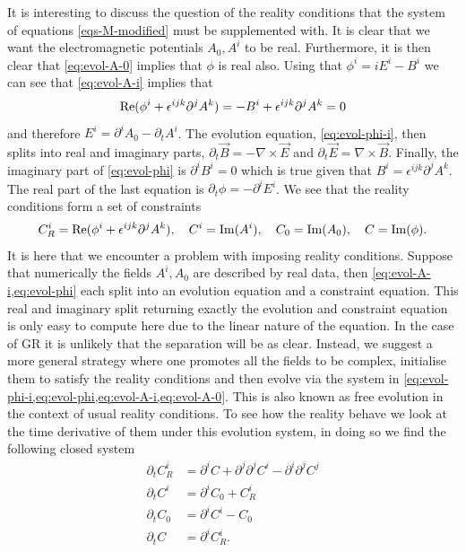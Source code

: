 \documentclass[10pt]{report}
\theoremstyle{definition}
\begin{document}
It is interesting to discuss the question of the reality conditions that the system of equations \cref{eqs-M-modified} must be supplemented with. It is clear that we want the electromagnetic potentials $A_0, A^i$ to be real. Furthermore, it is then clear that \cref{eq:evol-A-0} implies that $\phi$ is real also. Using that $\phi^i = i E^i - B^i$ we can see that \cref{eq:evol-A-i} implies that
\begin{align}
     {\rm Re}(\phi^i + \epsilon^{ijk} \partial^j A^k) = -B^i + \epsilon^{ijk} \partial^j A^k = 0
\end{align}
and therefore $E^i = \partial^i A_0 - \partial_t A^i$. The evolution equation, \cref{eq:evol-phi-i}, then splits into real and imaginary parts, $\partial_t \vec{B} = -\nabla \times \vec{E}$ and $\partial_t \vec{E} = \nabla \times \vec{B}$. Finally, the imaginary part of \cref{eq:evol-phi} is $\partial^i B^i = 0$ which is true given that $B^i = \epsilon^{ijk} \partial^j A^k$. The real part of the last equation is $\partial_t \phi = -\partial^i E^i$. We see that the reality conditions form a set of constraints
\begin{align}
    C^i_R = {\rm Re}(\phi^i + \epsilon^{ijk} \partial^j A^k), \quad C^i = {\rm Im}(A^i), \quad C_0 = {\rm Im}(A_0), \quad C = {\rm Im}(\phi). \label{eq:chiral-maxwell-reality-conditions}
\end{align}
It is here that we encounter a problem with imposing reality conditions. Suppose that numerically the fields $A^i,A_0$ are described by real data, then \cref{eq:evol-A-i,eq:evol-phi} each split into an evolution equation and a constraint equation. This real and imaginary split returning exactly the evolution and constraint equation is only easy to compute here due to the linear nature of the equation. In the case of GR it is unlikely that the separation will be as clear. Instead, we suggest a more general strategy where one promotes all the fields to be complex, initialise them to satisfy the reality conditions and then evolve via the system in \cref{eq:evol-phi-i,eq:evol-phi,eq:evol-A-i,eq:evol-A-0}. This is also known as free evolution in the context of usual reality conditions. To see how the reality behave we look at the time derivative of them under this evolution system, in doing so we find the following closed system
\begin{align}
    \partial_t C^i_R & = \partial^i C + \partial^j \partial^j C^i - \partial^i \partial^j C^j \\
    \partial_t C^i & = \partial^i C_0 + C^i_R \\
    \partial_t C_0 & = \partial^i C^i - C_0 \\
    \partial_t C & = \partial^i C^i_R.
\end{align} 
\end{document}
